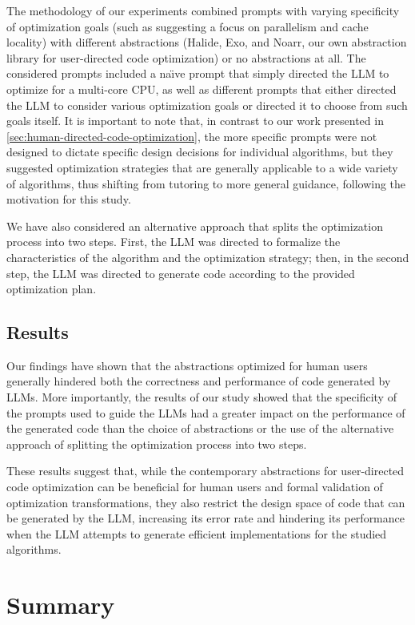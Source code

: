 The methodology of our experiments combined prompts with varying specificity of optimization goals (such as suggesting a focus on parallelism and cache locality) with different abstractions (Halide, Exo, and Noarr, our own abstraction library for user-directed code optimization) or no abstractions at all. The considered prompts included a na\"{\i}ve prompt that simply directed the LLM to optimize for a multi-core CPU, as well as different prompts that either directed the LLM to consider various optimization goals or directed it to choose from such goals itself. It is important to note that, in contrast to our work presented in \cref{sec:human-directed-code-optimization}, the more specific prompts were not designed to dictate specific design decisions for individual algorithms, but they suggested optimization strategies that are generally applicable to a wide variety of algorithms, thus shifting from tutoring to more general guidance, following the motivation for this study.

We have also considered an alternative approach that splits the optimization process into two steps. First, the LLM was directed to formalize the characteristics of the algorithm and the optimization strategy; then, in the second step, the LLM was directed to generate code according to the provided optimization plan.


\subsection{Results}\label{sec:llms-results}

Our findings have shown that the abstractions optimized for human users generally hindered both the correctness and performance of code generated by LLMs. More importantly, the results of our study showed that the specificity of the prompts used to guide the LLMs had a greater impact on the performance of the generated code than the choice of abstractions or the use of the alternative approach of splitting the optimization process into two steps.

These results suggest that, while the contemporary abstractions for user-directed code optimization can be beneficial for human users and formal validation of optimization transformations, they also restrict the design space of code that can be generated by the LLM, increasing its error rate and hindering its performance when the LLM attempts to generate efficient implementations for the studied algorithms.


\section{Summary}\label{sec:llms-summary}


